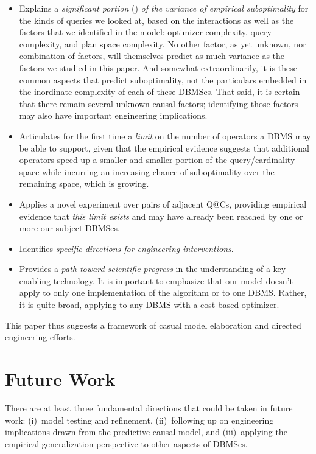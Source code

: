 \documentclass[prodmode,acmtods]{acmsmall}
\begin{document}
\begin{itemize}
\item Explains a {\em significant portion} () {\em of the variance of empirical suboptimality} for the kinds of queries we looked at, based on the interactions as well as the factors that we identified in the model: optimizer complexity, query complexity, and plan space complexity.  No other factor, as yet unknown, nor combination of factors,
will themselves predict as much variance as the factors we studied in this
paper. And somewhat extraordinarily, it is these common aspects that predict
suboptimality, not the particulars embedded in the inordinate complexity of
each of these DBMSes.
That said, it is certain that there remain several unknown causal factors;
identifying those factors may also have important engineering
implications.

\item Articulates for the first time a {\em limit} on the
  number of operators a \hbox{DBMS} may be able to support, given that the
  empirical evidence suggests that additional operators speed up a smaller
  and smaller portion of the query/cardinality space while incurring an
  increasing chance of suboptimality over the remaining space, which is
  growing.

\item Applies a novel experiment over pairs of adjacent Q@Cs, providing
  empirical evidence that {\em this limit exists} and may have already been
  reached by one or more our subject DBMSes.

\item Identifies {\em specific directions for engineering interventions}.

\item Provides a {\em path toward scientific progress} in the understanding
  of a key enabling technology.  It is important to emphasize that our model
  doesn't apply to only one implementation of the algorithm or to one
  \hbox{DBMS}.  Rather, it is quite broad, applying to any \hbox{DBMS} with
  a cost-based optimizer.

\end{itemize}
This paper thus suggests a framework of casual model elaboration and
directed engineering efforts.

\section{Future Work}\label{sec:future}
There are at least three fundamental directions that could be taken in
future work: (i)~model testing and refinement, (ii)~following up on engineering
implications drawn from the predictive causal model, and (iii)~applying the empirical
generalization perspective to other aspects of DBMSes.
\end{document}

